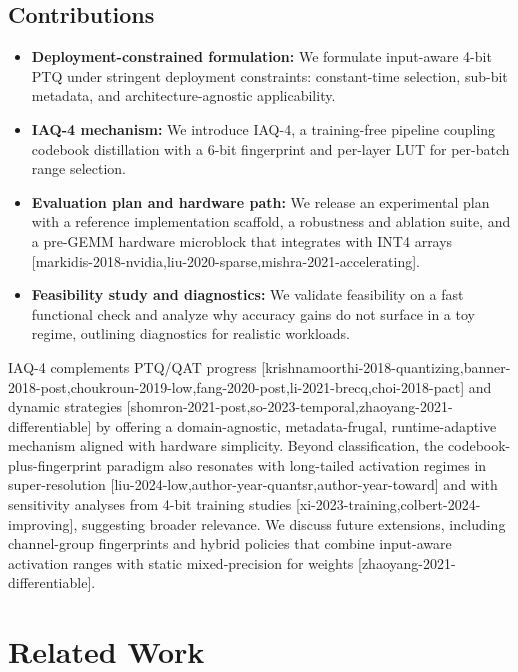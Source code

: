 \documentclass{article}
\begin{document}
\subsection{Contributions}
\begin{itemize}
\item \textbf{Deployment-constrained formulation:} We formulate input-aware 4-bit PTQ under stringent deployment constraints: constant-time selection, sub-bit metadata, and architecture-agnostic applicability.
\item \textbf{IAQ-4 mechanism:} We introduce IAQ-4, a training-free pipeline coupling codebook distillation with a 6-bit fingerprint and per-layer LUT for per-batch range selection.
\item \textbf{Evaluation plan and hardware path:} We release an experimental plan with a reference implementation scaffold, a robustness and ablation suite, and a pre-GEMM hardware microblock that integrates with INT4 arrays [markidis-2018-nvidia,liu-2020-sparse,mishra-2021-accelerating].
\item \textbf{Feasibility study and diagnostics:} We validate feasibility on a fast functional check and analyze why accuracy gains do not surface in a toy regime, outlining diagnostics for realistic workloads.
\end{itemize}

IAQ-4 complements PTQ/QAT progress [krishnamoorthi-2018-quantizing,banner-2018-post,choukroun-2019-low,fang-2020-post,li-2021-brecq,choi-2018-pact] and dynamic strategies [shomron-2021-post,so-2023-temporal,zhaoyang-2021-differentiable] by offering a domain-agnostic, metadata-frugal, runtime-adaptive mechanism aligned with hardware simplicity. Beyond classification, the codebook-plus-fingerprint paradigm also resonates with long-tailed activation regimes in super-resolution [liu-2024-low,author-year-quantsr,author-year-toward] and with sensitivity analyses from 4-bit training studies [xi-2023-training,colbert-2024-improving], suggesting broader relevance. We discuss future extensions, including channel-group fingerprints and hybrid policies that combine input-aware activation ranges with static mixed-precision for weights [zhaoyang-2021-differentiable].

\section{Related Work}
\end{document}
